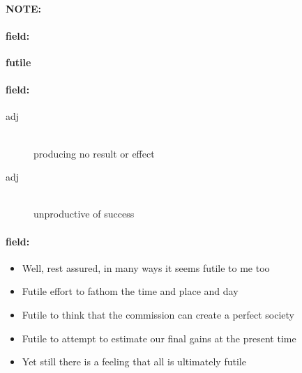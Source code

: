 \documentclass[12pt]{article}
\newenvironment{note}{\paragraph{NOTE:}}{}
\newenvironment{field}{\paragraph{field:}}{}
\begin{document}
\begin{note}
\begin{field}
\textbf{\large futile}
\end{field}


\begin{field}
\begin{description}
\item[adj] \hfill \\ 
producing no result or effect

\item[adj] \hfill \\ 
unproductive of success

\end{description}
\end{field}

\begin{field}
\begin{itemize}
\item Well, rest assured, in many ways it seems futile to me too
\item Futile effort to fathom the time and place and day
\item Futile to think that the commission can create a perfect society
\item Futile to attempt to estimate our final gains at the present time
\item Yet still there is a feeling that all is ultimately futile
\end{itemize}
\end{field}
\end{note}
\end{document}
